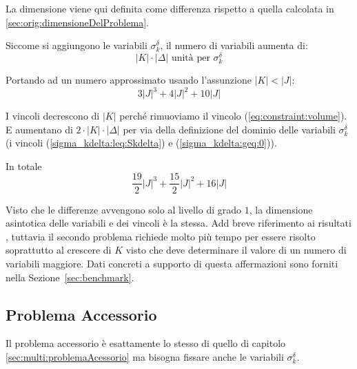 La dimensione viene qui definita come differenza rispetto a quella calcolata in
\ref{sec:orig:dimensioneDelProblema}.

Siccome si aggiungono le variabili $\sigma_k^\delta$, 
il numero di variabili aumenta di:
$$
|K|\cdot|\Delta| \text{ unità per } \sigma_k^\delta
$$

Portando ad un numero approssimato usando l'assunzione $|K| < |J|$:
$$
3|J|^3 + 4|J|^2 + 10|J|
$$


I vincoli decrescono di $|K|$ perché rimuoviamo il vincolo
(\ref{eq:constraint:volume}). E aumentano di $2 \cdot |K|\cdot|\Delta|$ per via
della definizione del dominio delle variabili $\sigma_k^\delta$
(i vincoli (\ref{sigma_kdelta:leq:Skdelta}) e (\ref{sigma_kdelta:geq:0})).

In totale
$$
\frac{19}{2}|J|^3 + \frac{15}{2}|J|^2 + 16|J|
$$


Visto che le differenze avvengono solo al livello di grado $1$, la
dimensione asintotica delle variabili e dei vincoli è la stessa.
\huge Add breve riferimento ai risultati\normalsize
, tuttavia il
secondo problema richiede molto più tempo per essere risolto soprattutto al
crescere di $K$ visto che deve determinare il valore di un numero di variabili
maggiore. Dati concreti a supporto di questa affermazioni sono forniti nella 
Sezione~\ref{sec:benchmark}.


\subsection{Problema Accessorio}

Il problema accessorio è esattamente lo stesso di quello di capitolo 
\ref{sec:multi:problemaAcessorio} ma bisogna fissare anche le variabili
$\sigma_k^\delta$.



